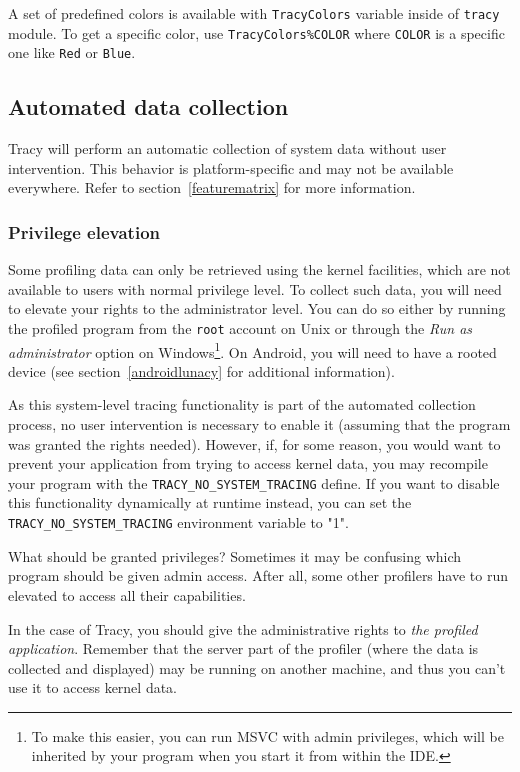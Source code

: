 \documentclass[hidelinks,titlepage,a4paper,twoside]{article}
\begin{document}
A set of predefined colors is available with \texttt{TracyColors} variable inside of \texttt{tracy} module.
To get a specific color, use \texttt{TracyColors\%COLOR} where \texttt{COLOR} is a specific one like \texttt{Red} or \texttt{Blue}.


\subsection{Automated data collection}
\label{automated}

Tracy will perform an automatic collection of system data without user intervention. This behavior is platform-specific and may not be available everywhere. Refer to section~\ref{featurematrix} for more information.

\subsubsection{Privilege elevation}
\label{privilegeelevation}

Some profiling data can only be retrieved using the kernel facilities, which are not available to users with normal privilege level. To collect such data, you will need to elevate your rights to the administrator level. You can do so either by running the profiled program from the \texttt{root} account on Unix or through the \emph{Run as administrator} option on Windows\footnote{To make this easier, you can run MSVC with admin privileges, which will be inherited by your program when you start it from within the IDE.}. On Android, you will need to have a rooted device (see section~\ref{androidlunacy} for additional information).

As this system-level tracing functionality is part of the automated collection process, no user intervention is necessary to enable it (assuming that the program was granted the rights needed). However, if, for some reason, you would want to prevent your application from trying to access kernel data, you may recompile your program with the \texttt{TRACY\_NO\_SYSTEM\_TRACING} define. If you want to disable this functionality dynamically at runtime instead, you can set the \texttt{TRACY\_NO\_SYSTEM\_TRACING} environment variable to "1".

\begin{bclogo}[
noborder=true,
couleur=black!5,
logo=\bclampe
]{What should be granted privileges?}
Sometimes it may be confusing which program should be given admin access. After all, some other profilers have to run elevated to access all their capabilities.

In the case of Tracy, you should give the administrative rights to \emph{the profiled application}. Remember that the server part of the profiler (where the data is collected and displayed) may be running on another machine, and thus you can't use it to access kernel data.
\end{bclogo}
\end{document}
